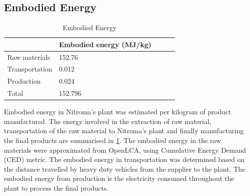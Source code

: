 \subsection{Embodied Energy}

\begin{table}
\vspace{-\intextsep}
\centering
    \caption{Embodied Energy}
    \label{tab:embodied}
\begin{tabular}{@{}lllll@{}}
\toprule
 & Embodied energy (MJ/kg)  \\ \midrule
Raw materials    & 152.76   \\
Transportation     &  0.012  \\
Production           & 0.024   \\
Total                  & 152.796   \\\bottomrule
\end{tabular}
\end{table} 

Embodied energy in Nitroma's plant was estimated per kilogram of product manufactured. The energy involved in the extraction of raw material, transportation of the raw material to Nitroma's plant and finally manufacturing the final products are summarised in \cref{tab:embodied}. The embodied energy in the raw materials were approximated from OpenLCA, using Cumulative Energy Demand (CED) metric. The embodied energy in transportation was determined based on the distance travelled by heavy duty vehicles from the supplier to the plant. The embodied energy from production is the electricity consumed throughout the plant to process the final products. 